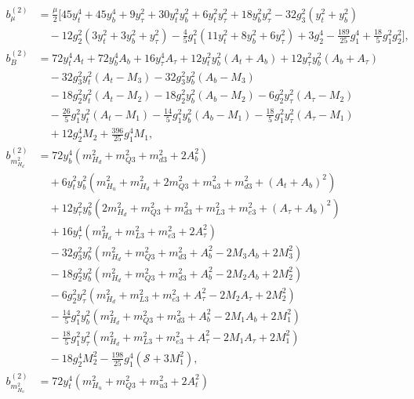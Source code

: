 \documentclass[preprint,amsmath,amssymb,aps,superscriptaddress,prd,showpacs,floatfix]{revtex4-1}
\begin{document}
\begin{subequations}\label{eq:MSSMTreeLevelCoeffs}
\begin{align}
b_\mu^{(2)}&=\frac{\mu}{2}\Bigg [ 45y_t^4+45y_b^4+9y_\tau^2+30y_t^2y_b^2+6y_t^2y_\tau^2+18y_b^2y_\tau^2-32g_3^2(y_t^2+y_b^2)\nonumber\\
&\quad{}-12g_2^2(3y_t^2+3y_b^2+y_\tau^2)-\frac{4}{5}g_1^2(11y_t^2+8y_b^2+6y_\tau^2)+3g_2^4-\frac{189}{25}g_1^4+\frac{18}{5}g_1^2g_2^2\Bigg ],\label{eq:MSSMmub2}\\
b_B^{(2)}&=72y_t^4A_t+72y_b^4A_b+16y_\tau^4A_\tau+12y_t^2y_b^2(A_t+A_b)+12y_\tau^2y_b^2(A_b+A_\tau)\nonumber\\
&\quad{}-32g_3^2y_t^2(A_t-M_3)-32g_3^2y_b^2(A_b-M_3)\nonumber\\
&\quad{}-18g_2^2y_t^2(A_t-M_2)-18g_2^2y_b^2(A_b-M_2)-6g_2^2y_\tau^2(A_\tau-M_2)\nonumber\\
&\quad{}-\frac{26}{5}g_1^2y_t^2(A_t-M_1)-\frac{14}{5}g_1^2y_b^2(A_b-M_1)-\frac{18}{5}g_1^2y_\tau^2(A_\tau-M_1)\nonumber\\
&\quad{}+12g_2^4M_2+\frac{396}{25}g_1^4M_1,\label{eq:MSSMBb2}\\
b_{m_{H_d}^2}^{(2)}&=72y_b^4\left ( m_{H_d}^2+m_{Q3}^2+m_{d3}^2+2A_b^2\right )\nonumber\\
&\quad{}+6y_t^2y_b^2\left ( m_{H_u}^2+m_{H_d}^2+2m_{Q3}^2+m_{u3}^2+m_{d3}^2+(A_t+A_b)^2\right )\nonumber\\
&\quad{}+12y_\tau^2y_b^2\left ( 2m_{H_d}^2+m_{Q3}^2+m_{d3}^2+m_{L3}^2+m_{e3}^2+(A_\tau+A_b)^2\right )\nonumber\\
&\quad{}+16y_\tau^4\left ( m_{H_d}^2+m_{L3}^2+m_{e3}^2+2A_\tau^2\right )\nonumber\\
&\quad{}-32g_3^2y_b^2\left ( m_{H_d}^2+m_{Q3}^2+m_{d3}^2+A_b^2-2M_3A_b+2M_3^2\right )\nonumber\\
&\quad{}-18g_2^2y_b^2\left ( m_{H_d}^2+m_{Q3}^2+m_{d3}^2+A_b^2-2M_2A_b+2M_2^2\right )\nonumber\\
&\quad{}-6g_2^2y_\tau^2\left ( m_{H_d}^2+m_{L3}^2+m_{e3}^2+A_\tau^2-2M_2A_\tau+2M_2^2\right )\nonumber\\
&\quad{}-\frac{14}{5}g_1^2y_b^2\left ( m_{H_d}^2+m_{Q3}^2+m_{d3}^2+A_b^2-2M_1A_b+2M_1^2\right )\nonumber\\
&\quad{}-\frac{18}{5}g_1^2y_\tau^2\left ( m_{H_d}^2+m_{L3}^2+m_{e3}^2+A_\tau^2-2M_1A_\tau+2M_1^2\right )\nonumber\\
&\quad{}-18g_2^4M_2^2-\frac{198}{25}g_1^4\left ( \mathcal{S}+3M_1^2\right ),\label{eq:MSSMmHd2b2}\\
b_{m_{H_u}^2}^{(2)}&=72y_t^4\left ( m_{H_u}^2+m_{Q3}^2+m_{u3}^2+2A_t^2\right )\nonumber\\

\end{align}
\end{subequations}
\end{document}
